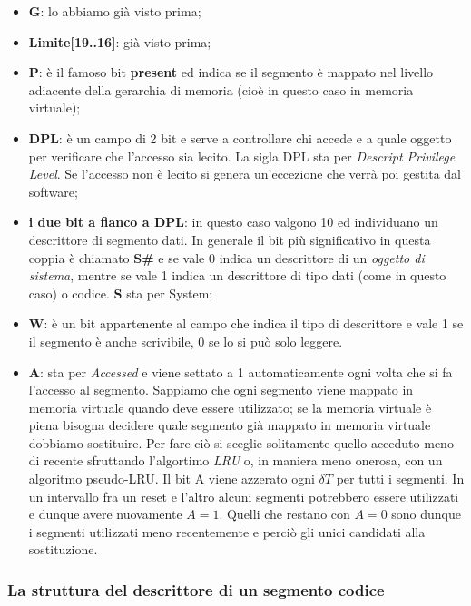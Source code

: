 \documentclass[11pt]{book}
\begin{document}
\begin{itemize}
  \begin{itemize}
  \item {\bf G}: lo abbiamo gi\`a visto prima;
  \item {\bf Limite[19..16]}: gi\`a visto prima;
  \item {\bf P}: \`e il famoso bit {\bf present} ed indica se il
    segmento \`e mappato nel livello adiacente della gerarchia di
    memoria (cio\`e in questo caso in memoria virtuale);
  \item {\bf DPL}: \`e un campo di 2 bit e serve a controllare chi
    accede e a quale oggetto per verificare che l'accesso sia
    lecito. La sigla DPL sta per {\em Descript Privilege Level}. Se
    l'accesso non \`e lecito si genera un'eccezione che verr\`a poi
    gestita dal software;
  \item {\bf i due bit a fianco a DPL}: in questo caso valgono 10 ed
    individuano un descrittore di segmento dati. In generale il bit
    pi\`u significativo in questa coppia \`e chiamato {\bf S\#} e se
    vale 0 indica un descrittore di un {\em oggetto di sistema},
    mentre se vale 1 indica un descrittore di tipo dati (come in
    questo caso) o codice. {\bf S} sta per System;
  \item {\bf W}: \`e un bit appartenente al campo che indica il tipo di
    descrittore e vale 1 se il segmento \`e anche scrivibile, 0 se lo si
    pu\`o solo leggere.
  \item {\bf A}: sta per {\em Accessed} e viene settato a 1
    automaticamente ogni volta che si fa l'accesso al
    segmento. Sappiamo che ogni segmento viene mappato in memoria
    virtuale quando deve essere utilizzato; se la memoria virtuale \`e
    piena bisogna decidere quale segmento gi\`a mappato in memoria
    virtuale dobbiamo sostituire. Per fare ci\`o si sceglie
    solitamente quello acceduto meno di recente sfruttando l'algortimo
    {\em LRU} o, in maniera meno onerosa, con un algoritmo
    pseudo-LRU. Il bit A viene azzerato ogni $\delta T$ per tutti i
    segmenti. In un intervallo fra un reset e l'altro alcuni segmenti
    potrebbero essere utilizzati e dunque avere nuovamente
    $A=1$. Quelli che restano con $A=0$ sono dunque i segmenti
    utilizzati meno recentemente e perci\`o gli unici candidati alla
    sostituzione.
\end{itemize}
\end{itemize}

\subsubsection{La struttura del descrittore di un segmento codice}
\end{document}
